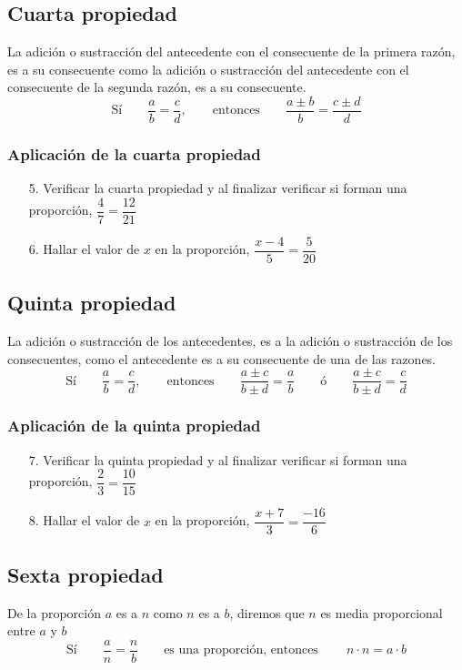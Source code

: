 \documentclass[10pt,twoside]{article}
\begin{document}
\subsection*{Cuarta propiedad}
La adición o sustracción del antecedente con el consecuente de la primera razón, es a su consecuente como la adición o sustracción del antecedente con el consecuente de la segunda razón, es a su consecuente.
\[\text{Sí} \qquad \dfrac{a}{b}=\dfrac{c}{d}, \qquad \text{entonces} \qquad \dfrac{a\pm b}{b}=\dfrac{c\pm d}{d} \]
\subsubsection*{Aplicaci\'{o}n de la cuarta propiedad}
\begin{enumerate}
\item[5.] Verificar la cuarta propiedad y al finalizar verificar si forman una proporción, \quad $\dfrac{4}{7}=\dfrac{12}{21}$
\item[6.] Hallar el valor de $x$ en la proporción, \qquad $\dfrac{x-4}{5}=\dfrac{5}{20}$
\end{enumerate}
\subsection*{Quinta propiedad}
La adición o sustracción de los antecedentes, es a la adición o sustracción de los consecuentes, como el antecedente es a su
consecuente de una de las razones.
\[\text{Sí} \qquad \dfrac{a}{b}=\dfrac{c}{d}, \qquad \text{entonces} \qquad \dfrac{a\pm c}{b\pm d}=\dfrac{a}{b} \qquad \text{ó} \qquad \dfrac{a\pm c}{b\pm d}=\dfrac{c}{d}\]
\subsubsection*{Aplicaci\'{o}n de la quinta propiedad}
\begin{enumerate}
\item[7.] Verificar la quinta propiedad y al finalizar verificar si forman una proporci\'{o}n, \quad $\dfrac{2}{3}=\dfrac{10}{15}$
\item[8.] Hallar el valor de $x$ en la proporci\'{o}n, \qquad $\dfrac{x+7}{3}=\dfrac{-16}{6}$
\end{enumerate}
\subsection*{Sexta propiedad}
De la proporción $a$ es a $n$ como $n$ es a $b$, diremos que $n$ es media proporcional entre $a$ y $b$
\[\text{Sí} \qquad \dfrac{a}{n}=\dfrac{n}{b} \qquad \text{es una proporción, entonces} \qquad\ n\cdot n=a\cdot b\]
\end{document}
